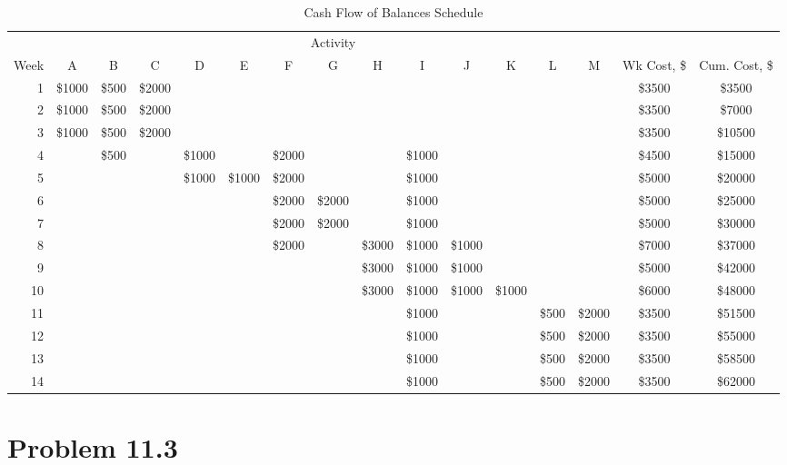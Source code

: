 \documentclass{article}
\begin{document}
			{\renewcommand{\arraystretch}{1.2} 
	\begin{sidewaystable}[!htbp]
  		\begin{center}
    		\caption{Cash Flow of Balances Schedule}
    		\label{tab:table3}
			
    		\begin{tabular}{rccccccccccccccc}
				 & \multicolumn{13}{c}{Activity} &  &  \\
				Week & A & B & C & D & E & F & G & H & I & J & K & L & M & Wk Cost, \$ & Cum. Cost, \$\\
				\hline
      			1 & \$1000 & \$500 & \$2000 &\multicolumn{10}{c}{} & \$3500 & \$3500\\
      			2 & \$1000 & \$500 & \$2000 &\multicolumn{10}{c}{} & \$3500 & \$7000\\
				3 & \$1000 & \$500 & \$2000 &\multicolumn{10}{c}{} & \$3500 & \$10500\\
				4 &        & \$500 &        & \$1000& &  \$2000 & & & \$1000 & \multicolumn{4}{c}{} &\$4500 & \$15000\\
				5 & &  & & \$1000& \$1000 & \$2000 &  &  & \$1000 & \multicolumn{4}{c}{} & \$5000 & \$20000\\
				6 & &  & &  && \$2000 & \$2000 &  & \$1000 &  & \multicolumn{3}{c}{} & \$5000 & \$25000\\
				7 &\multicolumn{3}{c}{}&  &  & \$2000 & \$2000&  & \$1000 & & \multicolumn{3}{c}{} & \$5000 & \$30000\\
				8 &\multicolumn{5}{c}{} & \$2000 & &  \$3000& \$1000 & \$1000& \multicolumn{3}{c}{} & \$7000 & \$37000\\
				9 &\multicolumn{5}{c}{} & &&  \$3000& \$1000 & \$1000& & & & \$5000 & \$42000\\
				10 &\multicolumn{7}{c}{}&\$3000 & \$1000 & \$1000&  \$1000& & & \$6000 & \$48000\\
				11 &\multicolumn{8}{c}{} & \$1000 & &  &\$500 & \$2000& \$3500 & \$51500\\
				12 &\multicolumn{8}{c}{} & \$1000 & &  &\$500 & \$2000& \$3500 & \$55000\\
				13 &\multicolumn{8}{c}{} & \$1000 & &  &\$500 & \$2000& \$3500 & \$58500\\
				14 &\multicolumn{8}{c}{} & \$1000 & &  & \$500& \$2000 & \$3500 & \$62000\\
				\hline
    		\end{tabular}
  		\end{center}
	\end{sidewaystable}
	}
	\pagebreak
	\section*{Problem 11.3}
\end{document}
